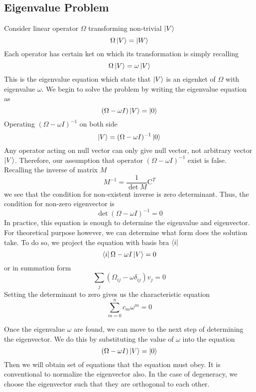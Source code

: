 \documentclass[../main.tex]{subfiles}
\begin{document}
\subsection*{Eigenvalue Problem}
Consider linear operator $\Omega$ transforming non-trivial $\ket{V}$
\begin{equation*}
	\Omega 	\ket{V}=\ket{W}
\end{equation*}
Each operator has certain ket on which its transformation is simply recalling
\begin{equation*}
	\Omega \ket{V}=\omega \ket{V}
\end{equation*}
This is the eigenvalue equation which state that $\ket{V}$ is an eigenket of $\Omega$ with eigenvalue $\omega$.
We begin to solve the problem by writing the eigenvalue equation as
\begin{equation*}
	(\Omega-\omega I)\ket{V}=\ket{0}
\end{equation*}
Operating $(\Omega-\omega I)^{-1}$ on both side
\begin{equation*}
	\ket{V}=(\Omega-\omega I)^{-1}\ket{0}
\end{equation*}
Any operator acting on null vector can only give null vector, not arbitrary vector $\ket{V}$.
Therefore, our assumption that operator $(\Omega-\omega I)^{-1}$ exist is false.
Recalling the inverse of matrix $M$
\begin{equation*}
	M^{-1}=\frac{1}{\det M}\text{C}^T
\end{equation*}
we see that the condition for non-existent inverse is zero determinant.
Thus, the condition for non-zero eigenvector is
\begin{equation*}
	\det (\Omega-\omega I)^{-1}=0
\end{equation*}
In practice, this equation is enough to determine the eigenvalue and eigenvector.
For theoretical purpose however, we can determine what form does the solution take.
To do so, we project the equation with basis bra $\bra{i}$
\begin{equation*}
	\bra{i}\Omega-\omega I\ket{V}=0
\end{equation*}
or in summation form
\begin{equation*}
	\sum_j (\Omega_{ij}-\omega\delta_{ij})v_j=0
\end{equation*}
Setting the determinant to zero gives us the characteristic equation
\begin{equation*}
	\sum_{m=0}^{n}c_m\omega^{m}=0
\end{equation*}

Once the eigenvalue $\omega$ are found, we can move to the next step of determining the eigenvector.
We do this by substituting the value of $\omega$ into the equation
\begin{equation*}
	(\Omega-\omega I)\ket{V}=\ket{0}
\end{equation*}
Then we will obtain set of equations that the equation must obey.
It is conventional to normalize the eigenvector also.
In the case of degeneracy, we choose the eigenvector such that they are orthogonal to each other.
\end{document}
